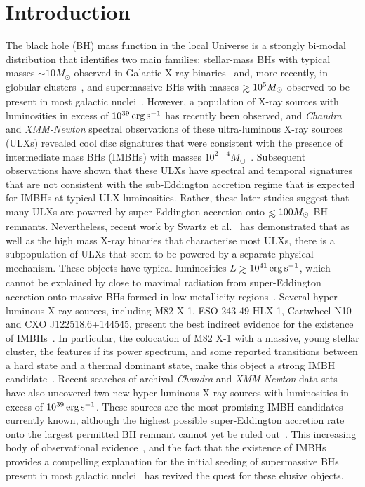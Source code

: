 \documentclass[aps,prd,showpacs,amssymb,floatfix,nofootinbib,superscriptaddress]{revtex4-1}%
\def\lesssim{\mathrel{\hbox{\rlap{\hbox{\lower4pt\hbox{$\sim$}}}\hbox{$<$}}}}
\def\gtrsim{\mathrel{\hbox{\rlap{\hbox{\lower4pt\hbox{$\sim$}}}\hbox{$>$}}}}
\begin{document}
\section{Introduction}   
The black hole (BH) mass function in the local Universe is a strongly bi-modal distribution that identifies two main families: stellar-mass BHs with typical masses \(\sim 10M_{\odot}\) observed in Galactic X-ray binaries~\cite{McClintock:2006} and, more recently, in globular clusters~\cite{Morscher:2013}, and supermassive BHs with masses \(\gtrsim 10^{5} M_{\odot}\) observed to be present in most galactic nuclei~\cite{Merloni:2008, Fukugita:2004}.  However, a population of X-ray sources with luminosities in excess of \(10^{39}\, \rm{ erg}\, \rm{s}^{-1} \) has recently been observed, and {\it{Chandra}} and {\it{XMM-Newton}} spectral observations of these ultra-luminous X-ray sources (ULXs) revealed cool disc signatures that were consistent with the presence of intermediate mass BHs (IMBHs) with masses \(10^{2-4} M_{\odot}\)~\cite{Miller:2004,Miller:2004b,Miller:2006_BOOK}. Subsequent observations have shown that these ULXs have spectral and temporal signatures that are not consistent with the sub-Eddington accretion regime that is expected for IMBHs at typical ULX luminosities. Rather, these later studies suggest that many ULXs are powered by super-Eddington accretion onto \(\lesssim 100 M_{\odot}\) BH remnants.  Nevertheless, recent work by Swartz et al.~\cite{Swartz:2011} has demonstrated that as well as the high mass X-ray binaries that characterise most ULXs, there is a subpopulation of ULXs that seem to be powered by a separate physical mechanism. These objects have typical luminosities \(L\gtrsim 10^{41}\, \rm{ erg}\, \rm{s}^{-1} \), which cannot be explained by close to maximal radiation from super-Eddington accretion onto massive BHs formed in low metallicity regions~\cite{Zampieri:2009, Belczynski:2010, Ohsuga:2011}. Several hyper-luminous X-ray sources, including M82 X-1, ESO 243-49 HLX-1, Cartwheel N10 and CXO J122518.6+144545, present the best indirect evidence for the existence of IMBHs~\cite{Matsumoto:2001,Farrel:2009,Wolter:2010,Jonker:2010}.  In particular, the colocation of M82 X-1 with a massive, young stellar cluster, the features if its power spectrum, and some reported transitions between a hard state and a thermal dominant state, make this object a strong IMBH candidate~\cite{Portegies:2004,Strohmayer:2003,Kaaret:2007,Feng:2010}.  Recent searches of archival {\it{Chandra}} and {\it{XMM-Newton}} data sets have also uncovered two new hyper-luminous X-ray sources with luminosities in excess of \(10^{39}\, \rm{ erg}\, \rm{s}^{-1} \). These sources are the most promising IMBH candidates currently known, although the highest possible super-Eddington accretion rate onto the largest permitted BH remnant cannot yet be ruled out~\cite{Sutton:2012}.  This increasing body of observational evidence~\cite{Trenti:2006,Coleman:2004}, and the fact that the existence of IMBHs provides a compelling explanation for the initial seeding of supermassive BHs present in most galactic nuclei~\cite{Volonteri:2010,Schneider:2002,Yu:2002} has revived the quest for these elusive objects.  
\end{document}
